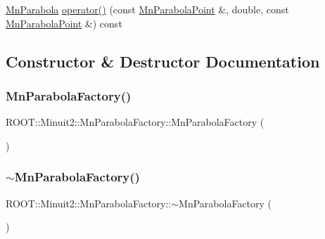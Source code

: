 \begin{DoxyCompactItemize}
\item 
\mbox{\hyperlink{classROOT_1_1Minuit2_1_1MnParabola}{Mn\+Parabola}} \mbox{\hyperlink{classROOT_1_1Minuit2_1_1MnParabolaFactory_ab4b6a74b071f4d780dbf6b4663c188b3}{operator()}} (const \mbox{\hyperlink{classROOT_1_1Minuit2_1_1MnParabolaPoint}{Mn\+Parabola\+Point}} \&, double, const \mbox{\hyperlink{classROOT_1_1Minuit2_1_1MnParabolaPoint}{Mn\+Parabola\+Point}} \&) const
\end{DoxyCompactItemize}


\subsection{Constructor \& Destructor Documentation}
\mbox{\label{classROOT_1_1Minuit2_1_1MnParabolaFactory_a6170ddac807544cd8f13dbb0b59fb568}} 
\subsubsection{\texorpdfstring{MnParabolaFactory()}{MnParabolaFactory()}\hspace{0.1cm}{\footnotesize\ttfamily [1/2]}}
{\footnotesize\ttfamily R\+O\+O\+T\+::\+Minuit2\+::\+Mn\+Parabola\+Factory\+::\+Mn\+Parabola\+Factory (\begin{DoxyParamCaption}{ }\end{DoxyParamCaption})\hspace{0.3cm}{\ttfamily [inline]}}

\mbox{\label{classROOT_1_1Minuit2_1_1MnParabolaFactory_ab5b7289c1e63637bc2ecc9ac051b57a5}} 
\subsubsection{\texorpdfstring{$\sim$MnParabolaFactory()}{~MnParabolaFactory()}\hspace{0.1cm}{\footnotesize\ttfamily [1/2]}}
{\footnotesize\ttfamily R\+O\+O\+T\+::\+Minuit2\+::\+Mn\+Parabola\+Factory\+::$\sim$\+Mn\+Parabola\+Factory (\begin{DoxyParamCaption}{ }\end{DoxyParamCaption})\hspace{0.3cm}{\ttfamily [inline]}}

